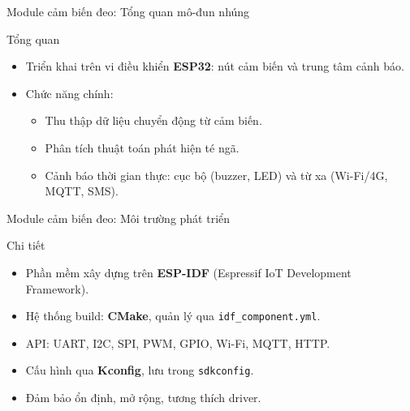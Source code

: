 \begin{frame}{Module cảm biến đeo: Tổng quan mô-đun nhúng}
    \begin{block}{Tổng quan}
        \begin{itemize}
            \item Triển khai trên vi điều khiển \textbf{ESP32}: nút cảm biến và trung tâm cảnh báo.
            \item Chức năng chính:
            \begin{itemize}
                \item Thu thập dữ liệu chuyển động từ cảm biến.
                \item Phân tích thuật toán phát hiện té ngã.
                \item Cảnh báo thời gian thực: cục bộ (buzzer, LED) và từ xa (Wi-Fi/4G, MQTT, SMS).
            \end{itemize}
        \end{itemize}
    \end{block}
\end{frame}

\begin{frame}{Module cảm biến đeo: Môi trường phát triển}
    \begin{block}{Chi tiết}
        \begin{itemize}
            \item Phần mềm xây dựng trên \textbf{ESP-IDF} (Espressif IoT Development Framework).
            \item Hệ thống build: \textbf{CMake}, quản lý qua \texttt{idf\_component.yml}.
            \item API: UART, I2C, SPI, PWM, GPIO, Wi-Fi, MQTT, HTTP.
            \item Cấu hình qua \textbf{Kconfig}, lưu trong \texttt{sdkconfig}.
            \item Đảm bảo ổn định, mở rộng, tương thích driver.
        \end{itemize}
    \end{block}
\end{frame}

